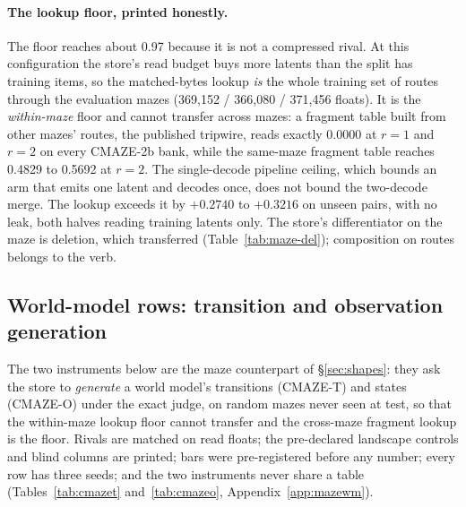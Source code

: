 \documentclass{article} %
\begin{document}
\paragraph{The lookup floor, printed honestly.} The floor reaches about 0.97 because it is not a
compressed rival. At this configuration the store's read budget buys more latents than the split
has training items, so the matched-bytes lookup \emph{is} the whole training set of routes
through the evaluation mazes (369,152 / 366,080 / 371,456 floats). %
It is the \emph{within-maze} floor and cannot transfer across mazes: a fragment table built
from other mazes' routes, the published tripwire, reads exactly 0.0000 at $r=1$ and $r=2$ on
every CMAZE-2b bank, while the same-maze fragment table reaches 0.4829 to 0.5692 at $r=2$.
The single-decode pipeline ceiling, which bounds an arm that emits one latent and decodes once, does not bound the two-decode merge. The lookup exceeds it by $+0.2740$ to $+0.3216$ on unseen pairs,
with no leak, both halves reading training latents only.
The store's differentiator on the maze is deletion, which transferred (Table~\ref{tab:maze-del}); composition on routes belongs to the verb.

\subsection{World-model rows: transition and observation generation}
\label{sec:maze-wm}

The two instruments below are the maze counterpart of \S\ref{sec:shapes}: they ask the store to
\emph{generate} a world model's transitions (CMAZE-T) and states (CMAZE-O) under the exact judge,
on random mazes never seen at test, so that the within-maze lookup floor cannot transfer and the
cross-maze fragment lookup is the floor. Rivals are matched on read floats; the pre-declared
landscape controls and blind columns are printed; bars were pre-registered before any number; every
row has three seeds; and the two instruments never share a table (Tables~\ref{tab:cmazet}
and~\ref{tab:cmazeo}, Appendix~\ref{app:mazewm}).

\end{document}
